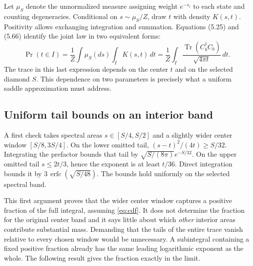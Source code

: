 \documentclass[11pt]{article}
\newcommand{\Tr}{\operatorname{Tr}}
\newcommand{\Prob}{\operatorname{Pr}}
\begin{document}
Let $\mu_S$ denote the unnormalized measure assigning weight $e^{-s_i}$ to each state and counting degeneracies. Conditional on $s\sim\mu_S/Z$, draw $t$ with density $K(s,t)$. Positivity allows exchanging integration and summation. Equations (5.25) and (5.66) identify the joint law in two equivalent forms:
\[
 \Prob(t\in I)=\frac{1}{Z}\int\mu_S(ds)\int_I K(s,t)\,dt
   =\frac{1}{Z}\int_I\frac{\Tr(C_b^\dagger C_b)}{\sqrt{4\pi t}}\,dt .
\]
The trace in this last expression depends on the center $t$ and on the selected diamond $S$. This dependence on two parameters is precisely what a uniform saddle approximation must address.

\subsection{Uniform tail bounds on an interior band}
A first check takes spectral areas $s\in[S/4,S/2]$ and a slightly wider center window $[S/8,3S/4]$. On the lower omitted tail, $(s-t)^2/(4t)\ge S/32$. Integrating the prefactor bounds that tail by $\sqrt{S/(8\pi)}e^{-S/32}$. On the upper omitted tail $s\le2t/3$, hence the exponent is at least $t/36$. Direct integration bounds it by $3\,\operatorname{erfc}(\sqrt{S/48})$. The bounds hold uniformly on the selected spectral band.

This first argument proves that the wider center window captures a positive fraction of the full integral, assuming \eqref{eq:cdf}. It does not determine the fraction for the original center band and it says little about which \emph{other} interior areas contribute substantial mass. Demanding that the tails of the entire trace vanish relative to every chosen window would be unnecessary. A subintegral containing a fixed positive fraction already has the same leading logarithmic exponent as the whole. The following result gives the fraction exactly in the limit.
\end{document}
